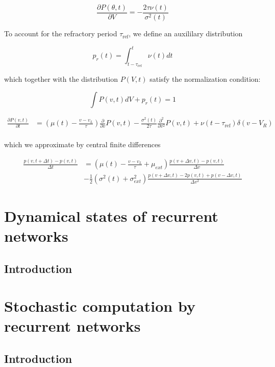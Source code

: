 \documentclass{ucetd}
\begin{document}
\begin{equation*}
\frac{\partial P(\theta,t)}{\partial V} = -\frac{2\tau\nu(t)}{\sigma^{2}(t)}
\end{equation*}

To account for the refractory period $\tau_{\mathrm{ref}}$, we define an auxililary distribution

\begin{equation*}
p_{r}(t) = \int_{t-\tau_{\mathrm{ref}}}^{t} \nu(t)dt
\end{equation*}

which together with the distribution $P(V,t)$ satisfy the normalization condition:

\begin{equation*}
\int P(v,t)dV + p_{r}(t) = 1
\end{equation*}

\begin{align*}
\frac{\partial P(v,t)}{\partial t} &= \left(\mu(t) - \frac{v-v_{L}}{\tau}\right) \frac{\partial}{\partial v} P(v,t) - \frac{\sigma^{2}(t)}{2\tau}\frac{\partial^{2}}{\partial v^{2}} P(v,t) + \nu(t-\tau_{\mathrm{ref}})\delta(v-V_{R})\\
\end{align*} 


which we approximate by central finite differences

\begin{align*}
\frac{p(v, t+\Delta t) - p(v,t)}{\Delta t} &= \left(\mu(t) - \frac{v-v_{L}}{\tau}+ \mu_{ext}\right)\frac{p(v+\Delta v, t) - p(v,t)}{\Delta v} \\
&- \frac{1}{2}\left(\sigma^{2}(t) + \sigma_{ext}^{2}\right)\frac{p(v+\Delta v, t) - 2p(v,t) + p(v-\Delta v, t)}{\Delta v^{2}}
\end{align*} 


\chapter{Dynamical states of recurrent networks}
\section{Introduction}


\chapter{Stochastic computation by recurrent networks}
\section{Introduction}
\end{document}
